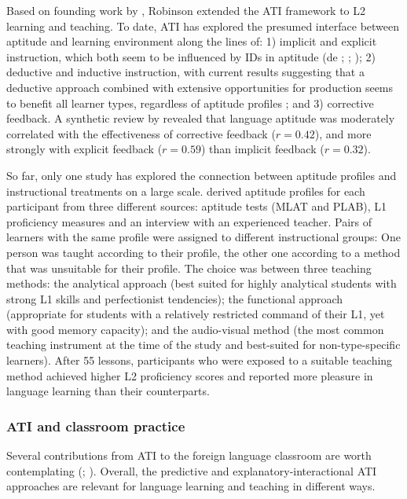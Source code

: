 \documentclass[output=paper]{langscibook}
\begin{document}
Based on founding work by \citet{Snow1991}, Robinson extended the ATI framework to L2 learning and teaching. To date, ATI has explored the presumed interface between aptitude and learning environment along the lines of: 1) implicit and explicit instruction, which both seem to be influenced by IDs in aptitude (de \citealt{Graaff1997}; \citealt{Robinson1997}; \citealt{Williams1999}); 2) deductive and inductive instruction, with current results suggesting that a deductive approach combined with extensive opportunities for production seems to benefit all learner types, regardless of aptitude profiles \citep{Erlam2005}; and 3) corrective feedback. A synthetic review by \citet{Li2017} revealed that language aptitude was moderately correlated with the effectiveness of corrective feedback ($r=0.42$), and more strongly with explicit feedback ($r=0.59$) than implicit feedback ($r=0.32$).

So far, only one study has explored the connection between aptitude profiles and instructional treatments on a large scale. \citet{Wesche1981} derived aptitude profiles for each participant from three different sources: aptitude tests (MLAT and PLAB), L1 proficiency measures and an interview with an experienced teacher. Pairs of learners with the same profile were assigned to different instructional groups: One person was taught according to their profile, the other one according to a method that was unsuitable for their profile. The choice was between three teaching methods: the analytical approach (best suited for highly analytical students with strong L1 skills and perfectionist tendencies); the functional approach (appropriate for students with a relatively restricted command of their L1, yet with good memory capacity); and the audio-visual method (the most common teaching instrument at the time of the study and best-suited for non-type-specific learners). After 55 lessons, participants who were exposed to a suitable teaching method achieved higher L2 proficiency scores and reported more pleasure in language learning than their counterparts. 

\subsubsection{ATI and classroom practice} %

Several contributions from ATI to the foreign language classroom are worth contemplating (\citealt{Cook2001}; \citealt{Ranta2008}). Overall, the predictive and explanatory-interactional ATI approaches are relevant for language learning and teaching in different ways. 
\end{document}

